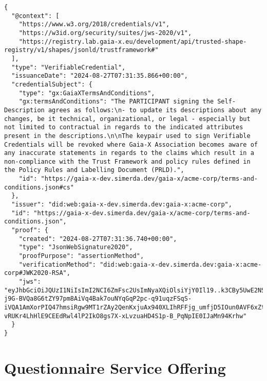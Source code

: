 \begin{verbatim}
{
  "@context": [
    "https://www.w3.org/2018/credentials/v1",
    "https://w3id.org/security/suites/jws-2020/v1",
    "https://registry.lab.gaia-x.eu/development/api/trusted-shape-registry/v1/shapes/jsonld/trustframework#"
  ],
  "type": "VerifiableCredential",
  "issuanceDate": "2024-08-27T07:31:35.866+00:00",
  "credentialSubject": {
    "type": "gx:GaiaXTermsAndConditions",
    "gx:termsAndConditions": "The PARTICIPANT signing the Self-Description agrees as follows:\n- to update its descriptions about any changes, be it technical, organizational, or legal - especially but not limited to contractual in regards to the indicated attributes present in the descriptions.\n\nThe keypair used to sign Verifiable Credentials will be revoked where Gaia-X Association becomes aware of any inaccurate statements in regards to the claims which result in a non-compliance with the Trust Framework and policy rules defined in the Policy Rules and Labelling Document (PRLD).",
    "id": "https://gaia-x-dev.simerda.dev/gaia-x/acme-corp/terms-and-conditions.json#cs"
  },
  "issuer": "did:web:gaia-x-dev.simerda.dev:gaia-x:acme-corp",
  "id": "https://gaia-x-dev.simerda.dev/gaia-x/acme-corp/terms-and-conditions.json",
  "proof": {
    "created": "2024-08-27T07:31:36.740+00:00",
    "type": "JsonWebSignature2020",
    "proofPurpose": "assertionMethod",
    "verificationMethod": "did:web:gaia-x-dev.simerda.dev:gaia-x:acme-corp#JWK2020-RSA",
    "jws": "eyJhbGciOiJQUzI1NiIsImI2NCI6ZmFsc2UsImNyaXQiOlsiYjY0Il19..k3CBy5UwE2NScZwLPZcyY1Pv0Q-j9G-BVQa8G6tZY97pm8AiVq4Bak7ouNYqGqP2pc-q91uqzFSqS-iVQA1AmXorPIQ47hmsiRgw9MT1rZAy2QenKxjuAx940XLIhRFFjg_umfjD5IOun0AVF6xZtCz_3O90QGGCpoeJTrQTiesZfXx0BnE3lZBtsiOWALXRLR4ms290xG6tKYGIBhVhpfA4L0rRcgc0DGsCtP4nyKOvVGvOAwVUYf0WOoIbLDxp79qTUX0QWD894C70ZTBz-vRUKr4LhHlE9CEEdRwl4lP2IkO8gs7X-xLvzuaHD4S1p-B_PqNpIE0IJaMn94Krhw"
  }
}
\end{verbatim}


\section{Questionnaire Service Offering}

